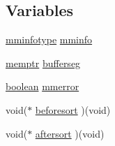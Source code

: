 \subsection*{Variables}
\begin{DoxyCompactItemize}
\item 
\hyperlink{structmminfotype}{mminfotype} \hyperlink{ID__MM_8H_ac3be51de4543720a019084a1445fe497}{mminfo}
\item 
\hyperlink{ID__MM_8H_a04062decc7eb282b066c65e9137bb9bf}{memptr} \hyperlink{ID__MM_8H_a08b9369ae972be8f272065cdf755c4f7}{bufferseg}
\item 
\hyperlink{ID__HEAD_8H_a7c6368b321bd9acd0149b030bb8275ed}{boolean} \hyperlink{ID__MM_8H_ae7aac7996350e0ba6ec288d45c450b68}{mmerror}
\item 
void($\ast$ \hyperlink{ID__MM_8H_a615c8b50b8f67f423250c0ac676a9809}{beforesort} )(void)
\item 
void($\ast$ \hyperlink{ID__MM_8H_ae0417d5723e6713c09a179a9c89b1f14}{aftersort} )(void)
\end{DoxyCompactItemize}


